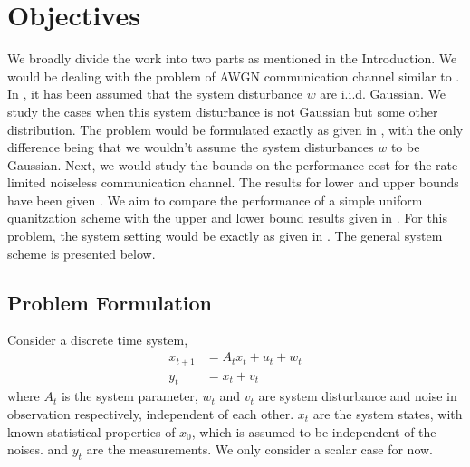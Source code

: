 \documentclass[12pt]{caltech_thesis_progress2}
\begin{document}
\chapter{Objectives}
We broadly divide the work into two parts as mentioned in the Introduction. We would be dealing with the problem of AWGN communication channel similar to \cite{anatoly}. In \cite{anatoly}, it has been assumed that the system disturbance $w$ are i.i.d. Gaussian. We study the cases when this system disturbance is not Gaussian but some other distribution. The problem would be formulated exactly as given in \cite{anatoly}, with the only difference being that we wouldn't assume the system disturbances $w$ to be Gaussian. Next, we would study the bounds on the performance cost for the rate-limited noiseless communication channel. The results for lower and upper bounds have been given \cite{victoria}. We aim to compare the performance of a simple uniform quanitzation scheme with the upper and lower bound results given in \cite{victoria}. For this problem, the system setting would be exactly as given in \cite{victoria}. The general system scheme is presented below.
%
	\section{Problem Formulation}
	\label{problem}
		Consider a discrete time system,
			\begin{align}
			\label{system}
				x_{t+1}&=A_{t}x_{t} + u_{t} + w_{t}\\
				y_{t}&=x_{t}+v_{t}
			\end{align}
			where $A_{t}$ is the system parameter, $w_{t}$ and $v_{t}$ are system disturbance and noise in observation respectively, independent of each other. $x_{t}$ are the system states, with known statistical properties of $x_{0}$, which is assumed to be independent of the noises. and $y_{t}$ are the measurements. We only consider a scalar case for now.\\
\end{document}
